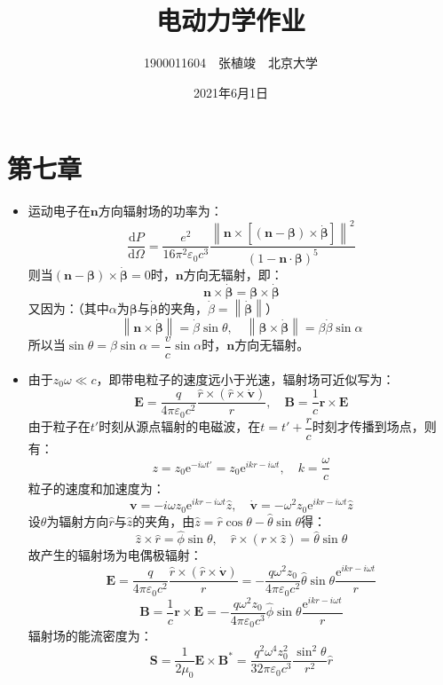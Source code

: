 \documentclass[a4paper,fontset=none]{ctexart}
\begin{document}
\title{\textbf{电动力学作业}}
\author{1900011604\ \ 张植竣\ \ 北京大学}
\date{2021年6月1日}
\maketitle

\section*{第七章}

\begin{itemize}

    \item[1.]
    运动电子在$\bm{n}$方向辐射场的功率为：
    \[
        \frac{\mathrm{d}P}{\mathrm{d}\varOmega} = \frac{e^2}{16\pi^2\varepsilon_0c^3} \frac{\left\|\bm{n} \times \left[(\bm{n}-\bm{\beta}) \times \dot{\bm{\beta}}\right]\right\|^2}{(1 - \bm{n}\cdot\bm{\beta})^5}
    \]
    则当$(\bm{n}-\bm{\beta})\times\dot{\bm{\beta}}=0$时，$\bm{n}$方向无辐射，即：
    \[
        \bm{n} \times \dot{\bm{\beta}} = \bm{\beta} \times \dot{\bm{\beta}}
    \]
    又因为：（其中$\alpha$为$\bm{\beta}$与$\dot{\bm{\beta}}$的夹角，$\dot{\beta}=\left\|\dot{\bm{\beta}}\right\|$）
    \[
        \left\|\bm{n} \times \dot{\bm{\beta}}\right\| = \dot{\beta}\sin\theta,\quad \left\|\bm{\beta} \times \dot{\bm{\beta}}\right\| = \beta\dot{\beta}\sin\alpha
    \]
    所以当$\sin\theta=\beta\sin\alpha=\dfrac{v}{c}\sin\alpha$时，$\bm{n}$方向无辐射。

    \item[3.(1)]
    由于$z_0\omega\ll c$，即带电粒子的速度远小于光速，辐射场可近似写为：
    \[
        \bm{E} = \frac{q}{4\pi\varepsilon_0c^2} \frac{\hat{r}\times(\hat{r}\times\dot{\bm{v}})}{r},\quad \bm{B} = \frac{1}{c}\bm{r} \times \bm{E}
    \]
    由于粒子在$t'$时刻从源点辐射的电磁波，在$t=t'+\dfrac{r}{c}$时刻才传播到场点，则有：
    \[
        z = z_0\mathrm{e}^{-i\omega t'} = z_0\mathrm{e}^{ikr-i\omega t},\quad k = \frac{\omega}{c}
    \]
    粒子的速度和加速度为：
    \[
        \bm{v} = -i\omega z_0\mathrm{e}^{ikr-i\omega t}\hat{z},\quad
        \dot{\bm{v}} = -\omega^2z_0\mathrm{e}^{ikr-i\omega t}\hat{z}
    \]
    设$\theta$为辐射方向$\hat{r}$与$\hat{z}$的夹角，由$\hat{z}=\hat{r}\cos\theta-\hat{\theta}\sin\theta$得：
    \[
        \hat{z} \times \hat{r} = \hat{\phi}\sin\theta,\quad
        \hat{r} \times (\hat{r} \times \hat{z}) = \hat{\theta}\sin\theta
    \]
    故产生的辐射场为电偶极辐射：
    \[
        \bm{E} = \frac{q}{4\pi\varepsilon_0c^2} \frac{\hat{r}\times(\hat{r}\times\dot{\bm{v}})}{r} = -\frac{q\omega^2 z_0}{4\pi\varepsilon_0c^2} \hat{\theta}\sin\theta \frac{\mathrm{e}^{ikr-i\omega t}}{r}
    \]
    \[
        \bm{B} = \frac{1}{c}\bm{r} \times \bm{E} = -\frac{q\omega^2 z_0}{4\pi\varepsilon_0c^3} \hat{\phi}\sin\theta \frac{\mathrm{e}^{ikr-i\omega t}}{r}
    \]
    辐射场的能流密度为：
    \[
        \bm{S} = \frac{1}{2\mu_0}\bm{E} \times \bm{B}^* = \frac{q^2\omega^4z_0^2}{32\pi\varepsilon_0c^3}\frac{\sin^2\theta}{r^2}\hat{r}
    \]


\end{itemize}
\end{document}
